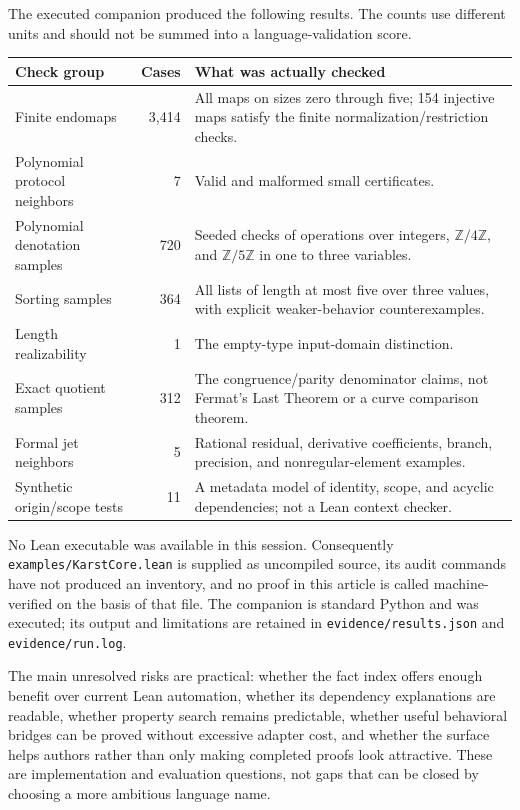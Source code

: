 \documentclass[11pt,letterpaper]{article}
\newcommand{\code}[1]{\nolinkurl{#1}}
\newcommand{\Z}{\mathbb Z}
\theoremstyle{remark}
\begin{document}
The executed companion produced the following results. The counts use different
units and should not be summed into a language-validation score.
\begin{center}\small
\begin{tabularx}{\textwidth}{@{}Y r Y@{}}
\toprule
Check group & Cases & What was actually checked\\
\midrule
Finite endomaps & 3,414 & All maps on sizes zero through five; 154 injective
maps satisfy the finite normalization/restriction checks.\\
Polynomial protocol neighbors & 7 & Valid and malformed small certificates.\\
Polynomial denotation samples & 720 & Seeded checks of operations over integers,
$\Z/4\Z$, and $\Z/5\Z$ in one to three variables.\\
Sorting samples & 364 & All lists of length at most five over three values,
with explicit weaker-behavior counterexamples.\\
Length realizability & 1 & The empty-type input-domain distinction.\\
Exact quotient samples & 312 & The congruence/parity denominator claims, not
Fermat's Last Theorem or a curve comparison theorem.\\
Formal jet neighbors & 5 & Rational residual, derivative coefficients, branch,
precision, and nonregular-element examples.\\
Synthetic origin/scope tests & 11 & A metadata model of identity, scope, and
acyclic dependencies; not a Lean context checker.\\
\bottomrule
\end{tabularx}
\end{center}

No Lean executable was available in this session. Consequently
\code{examples/KarstCore.lean} is supplied as uncompiled source, its audit
commands have not produced an inventory, and no proof in this article is
called machine-verified on the basis of that file. The companion is standard
Python and was executed; its output and limitations are retained in
\code{evidence/results.json} and \code{evidence/run.log}.

The main unresolved risks are practical: whether the fact index offers enough
benefit over current Lean automation, whether its dependency explanations are
readable, whether property search remains predictable, whether useful behavioral
bridges can be proved without excessive adapter cost, and whether the surface
helps authors rather than only making completed proofs look attractive.
These are implementation and evaluation questions, not gaps that can be
closed by choosing a more ambitious language name.
\end{document}
